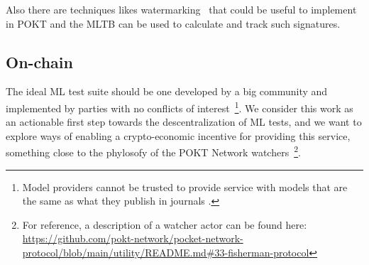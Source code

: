Also there are techniques likes watermarking~\cite{kirchenbauer2023watermark} that could be useful to implement in POKT and the \gls{MLTB} can be used to calculate and track such signatures.

\subsection*{On-chain}

The ideal \gls{ML} test suite should be one developed by a big community and implemented by parties with no conflicts of interest~\footnote{Model providers cannot be trusted to provide service with models that are the same as what they publish in journals \cite{chen_how_2023}.}. 
We consider this work as an actionable first step towards the descentralization of \gls{ML} tests, and we want to explore ways of enabling a crypto-economic incentive for providing this service, something close to the phylosofy of the POKT Network watchers~\footnote{For reference, a description of a watcher actor can be found here: \url{https://github.com/pokt-network/pocket-network-protocol/blob/main/utility/README.md\#33-fisherman-protocol}}.
